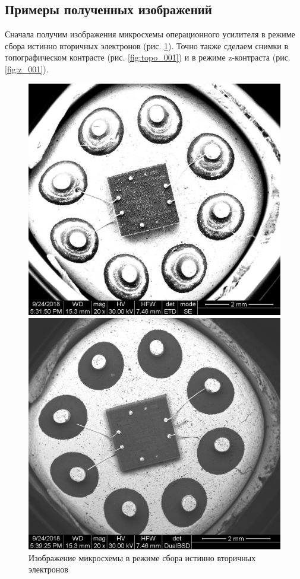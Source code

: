 \documentclass[a4paper, 12pt]{article}
\begin{document}
	\subsection{Примеры полученных изображений}
	Сначала получим изображения микросхемы операционного усилителя в режиме сбора истинно вторичных электронов (рис. \ref{fig:iv_001}). Точно также сделаем снимки в топографическом контрасте (рис. \ref{fig:topo_001}) и в режиме z-контраста (рис. \ref{fig:z_001}).\par
	\begin{figure}[!htb]
			\includegraphics[width=\linewidth]{iv_001.jpg}
			\caption{Изображение микросхемы в режиме сбора истинно вторичных электронов}
			\label{fig:iv_001}
		\endminipage\hfill
			\includegraphics[width=\linewidth]{a_001.tif}

\end{figure}
\end{document}
